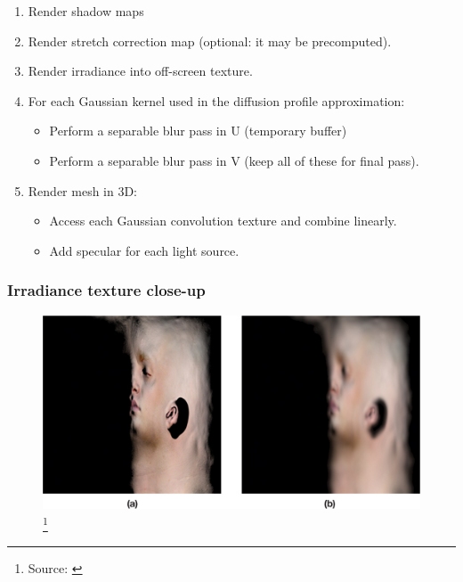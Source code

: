 \documentclass{f4_beamer_metropolis}
\newcommand\blfootnote[1]{%
  \begingroup
  \renewcommand\thefootnote{}\footnote{#1}%
  \addtocounter{footnote}{-1}%
  \endgroup
}
\begin{document}
\begin{frame}[t]
{    \begin{enumerate}
      \item Render shadow maps
      \item Render stretch correction map (optional: it may be precomputed).
      \item Render irradiance into off-screen texture.
      \item For each Gaussian kernel used in the diffusion profile approximation:
        \begin{itemize}
          \item Perform a separable blur pass in U (temporary buffer)
          \item Perform a separable blur pass in V (keep all of these for final pass).
        \end{itemize}
      \item Render mesh in 3D:
        \begin{itemize}
          \item Access each Gaussian convolution texture and combine linearly.
          \item Add specular for each light source.
        \end{itemize}
    \end{enumerate}
  }
\end{frame}


\begin{frame}[t]
  \frametitle{Irradiance texture close-up}
  \begin{figure}[!h]
    \centering
    \includegraphics[scale=0.9,keepaspectratio]{./images/irradiance-texture-adrian.jpg}
    \blfootnote{Source: \citet{efficient-human-skin-rendering}}
  \end{figure}
\end{frame}
\end{document}

